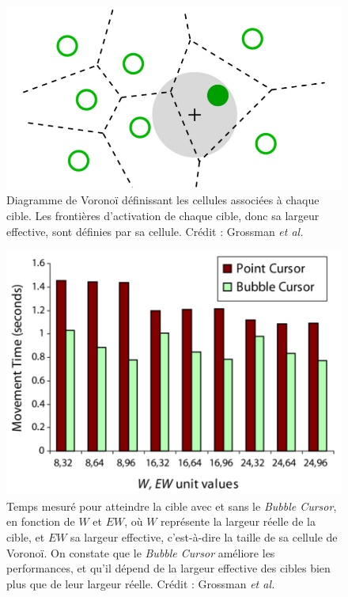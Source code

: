 	\begin{figure}[ht]
		\centering
		\includegraphics[width=\textwidth]{figures/voronoi}
		\caption{Diagramme de Voronoï définissant les cellules associées à chaque cible. Les frontières d'activation de chaque cible, donc sa largeur effective, sont définies par sa cellule. Crédit : Grossman \emph{et al.}}
		\label{fig:voronoi}
	\end{figure}

	\begin{figure}[ht]
		\centering
		\includegraphics[width=\textwidth]{figures/bubbleResults}
		\caption{Temps mesuré pour atteindre la cible avec et sans le \emph{Bubble Cursor}, en fonction de $W$ et $EW$, où $W$ représente la largeur réelle de la cible, et $EW$ sa largeur effective, c'est-à-dire la taille de sa cellule de Voronoï. On constate que le \emph{Bubble Cursor} améliore les performances, et qu'il dépend de la largeur effective des cibles bien plus que de leur largeur réelle. Crédit : Grossman \emph{et al.}}
		\label{fig:bubbleResults}
	\end{figure}

